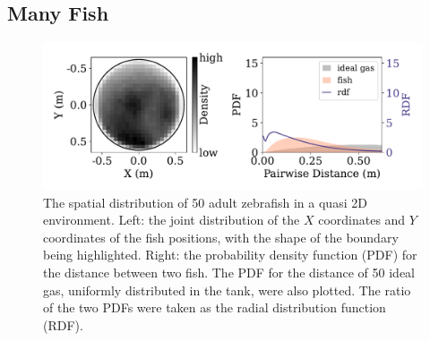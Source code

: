 \documentclass[11pt,twoside]{report}
\begin{document}
\subsection{Many Fish}
\label{section:fish_many_2d}

\begin{figure}
  \includegraphics[width=\linewidth]{dist-50-fish}
  \caption[The 2D spatial distribution of 50 fish]{The spatial distribution of 50 adult zebrafish in a quasi 2D environment. Left: the joint distribution of the $X$ coordinates and $Y$ coordinates of the fish positions, with the shape of the boundary being highlighted. Right: the probability density function (PDF) for the distance between two fish. The PDF for the distance of 50 ideal gas, uniformly distributed in the tank, were also plotted. The ratio of the two PDFs were taken as the radial distribution function (RDF).}
  \label{fig:density_2d_fish_3}
\end{figure}
\end{document}
